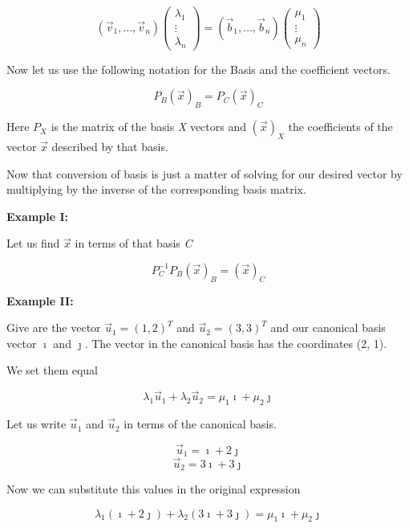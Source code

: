 \[
    (\vec{v}_1, \dots, \vec{v}_ n) 
    \begin{pmatrix} \lambda_1 \\ \vdots \\ \lambda_n \end{pmatrix}
    =
    (\vec{b}_1, \dots, \vec{b}_ n) 
    \begin{pmatrix} \mu_1 \\ \vdots \\ \mu_n \end{pmatrix}
\]

Now let us use the following notation for the Basis and the coefficient vectors.

\[
    P_B {(\vec{x})}_B = P_C {(\vec{x})}_C
\]

Here \(P_{X}\) is the matrix of the basis \emph{X} vectors and \({(\vec{x})}_X\) the coefficients of the
vector \(\vec{x}\) described by that basis.
\vspace{\baselineskip}

Now that conversion of basis is just a matter of solving for 
our desired vector by multiplying
by the inverse of the corresponding basis matrix.
\vspace{\baselineskip}

\textbf{Example I:}
\vspace{\baselineskip}

Let us find \(\vec{x}\) in terms of that basis \emph{C}

\[
    P_{C}^{-1} P_B {(\vec{x})}_B = {(\vec{x})}_C
\]

\textbf{Example II:}
\vspace{\baselineskip}

Give are the vector \(\vec{u}_1 = {(1,2)}^T\) and \(\vec{u}_2 = {(3, 3)}^T\)
and our canonical basis vector \(\imath\) and \(\jmath\). The
vector in the canonical basis has the coordinates (2, 1). 
\vspace{\baselineskip}

We set them equal

\[
    \lambda_1 \vec{u}_1 + \lambda_2 \vec{u}_2 = \mu_1 \imath + \mu_2 \jmath 
\]

Let us write \(\vec{u}_1\) and \(\vec{u}_2\) in terms of the canonical basis.

\[
    \vec{u}_1 = \imath + 2 \jmath
\]
\[
    \vec{u}_2 = 3 \imath + 3 \jmath
\]

Now we can substitute this values in the original expression

\[
    \lambda_1 (\imath + 2 \jmath) + \lambda_2 (3 \imath + 3 \jmath) = \mu_1 \imath + \mu_2 \jmath 
\]

